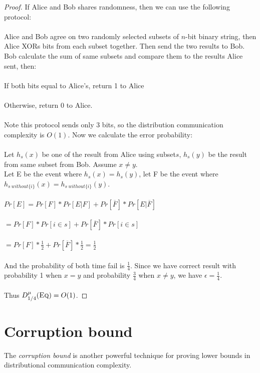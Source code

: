 \documentclass[11pt,oneside]{book}
\theoremstyle{plain}
\theoremstyle{definition}
\theoremstyle{plain}
\newcommand{\Eq}{\textsc{Eq}}
\begin{document}
\begin{proof}
	If Alice and Bob shares randomness, then we can use the following protocol:\\
	\\
	Alice and Bob agree on two randomly selected subsets of $n$-bit binary string, then Alice XORs bits from each subset together. Then send the two results to Bob. Bob calculate the sum of same subsets and compare them to the results Alice sent, then:\\ 
	\\
	If both bits equal to Alice's, return 1 to Alice\\
	\\
	Otherwise, return 0 to Alice.\\
	\\
	Note this protocol sends only 3 bits, so the distribution communication complexity is $O(1)$. Now we calculate the error probability: \\
	\\
	Let $h_s(x)$ be one of the result from Alice using subset$s$, $h_s(y)$ be the result from same subset from Bob. Assume $x \neq y$. \\
	Let E be the event where $h_s(x) = h_s(y)$, let F be the event where $h_{s\ without\{i\}}(x)=h_{s\ without\{i\}}(y)$.\\
	\\
	$Pr[E] = Pr[F]*Pr[E|F] + Pr[\overline{F}]*Pr[E|\overline{F}]$\\
	\\
	$=Pr[F]*Pr[i \in s] + Pr[\overline{F}]*Pr[i \in s]$\\
	\\
	$=Pr[F]*\frac12+Pr[\overline{F}]*\frac12 = \frac12$\\
	\\
	And the probability of both time fail is $\frac14$. Since we have correct result with probability 1 when $x = y$ and probability $\frac34$ when $x \neq y$, we have $\epsilon = \frac14$.\\ 
	\\
	Thus $D^\mu_{1/4}(\Eq) = O(1)$.
\end{proof}



 \section{Corruption bound}

The \emph{corruption bound} is another powerful technique for proving lower bounds in distributional communication complexity.
\end{document}
